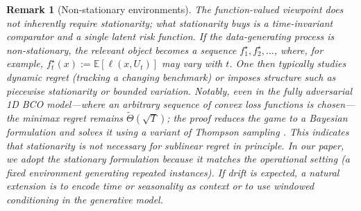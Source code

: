 \documentclass[11pt]{article}
\newtheorem{remark}{Remark}
\providecommand{\E}{\mathbb{E}}
\providecommand{\Eb}[1]{\E\!\left[#1\right]}
\begin{document}
\begin{remark}[Non-stationary environments]
\label{rem:nonstationary}
The function-valued viewpoint does \emph{not} inherently require stationarity; what stationarity buys is a \emph{time-invariant comparator} and a \emph{single} latent risk function. If the data-generating process is non-stationary, the relevant object becomes a sequence
$f^\star_1,f^\star_2,\dots$, where, for example, $f_t^\star(x):=\Eb{\ell(x,U_t)}$ may vary with $t$. One then typically studies \emph{dynamic regret} (tracking a changing benchmark) or imposes structure such as piecewise stationarity or bounded variation. Notably, even in the fully adversarial 1D BCO model---where an arbitrary sequence of convex loss functions is chosen---the minimax regret remains $\widetilde\Theta(\sqrt{T})$; the proof reduces the game to a Bayesian formulation and solves it
using a variant of Thompson sampling \citep{bubeck2015bco1d}. This indicates that stationarity is not necessary for
sublinear regret \emph{in principle}. In our paper, we adopt the stationary formulation because it matches the operational setting (a fixed environment generating repeated instances). If drift is expected, a natural extension is to encode time or seasonality as context \citealp{zhang2025contextual} or to use windowed conditioning in the generative model.
\end{remark}
\end{document}
